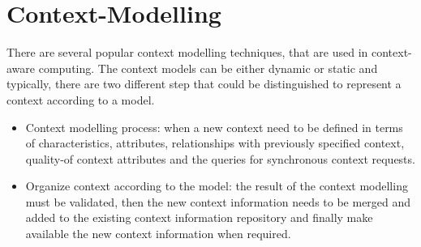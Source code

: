 \documentclass{thesisreport}
\begin{document}
\section{Context-Modelling}
 There are several popular context modelling techniques, that are used in context-aware computing. The context models can be either dynamic or static and typically, there are two different step that could be distinguished to represent a context according to a model.
 \begin{itemize}
     \item Context modelling process: when a new context need to be defined in terms of characteristics, attributes, relationships with previously specified context, quality-of context attributes and the queries for synchronous context requests.
     \item Organize context according to the model: the result of the context modelling must be validated, then the new context information needs to be merged and added to the existing context information repository and finally make available the new context information when required.
 \end{itemize}
 
\end{document}

